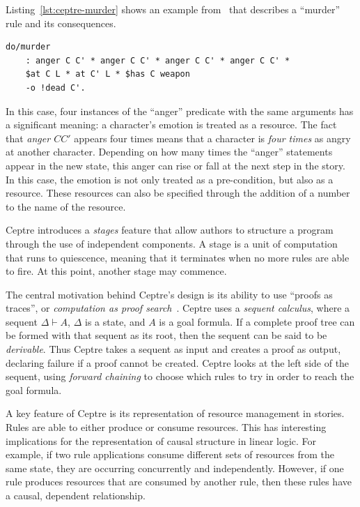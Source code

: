 \documentclass[11pt]{report}
\begin{document}
Listing~\ref{lst:ceptre-murder} shows an example from~\citet{martens2015ceptre}
that describes a ``murder'' rule and its consequences.

\begin{lstlisting}[label=lst:ceptre-murder,showstringspaces=false]
do/murder
    : anger C C' * anger C C' * anger C C' * anger C C' *
    $at C L * at C' L * $has C weapon
    -o !dead C'.
\end{lstlisting}

In this case, four instances of the ``anger'' predicate with the same arguments
has a significant meaning: a character's emotion is treated as a resource. The
fact that \emph{anger $C C'$} appears four times means that a character is
\emph{four times} as angry at another character. Depending on how many times the
``anger'' statements appear in the new state, this anger can rise or fall at the
next step in the story. In this case, the emotion is not only treated as a
pre-condition, but also as a resource. These resources can also be specified
through the addition of a number to the name of the resource.

Ceptre introduces a \emph{stages} feature that allow authors to structure a
program through the use of independent components. A stage is a unit of
computation that runs to quiescence, meaning that it terminates when no more
rules are able to fire. At this point, another stage may commence.

The central motivation behind Ceptre's design is its ability to use ``proofs as
traces'', or \emph{computation as proof search}~\citep{hodas1991logic}. Ceptre
uses a \emph{sequent calculus}, where a sequent $\Delta \vdash A$, $\Delta$ is a
state, and $A$ is a goal formula. If a complete proof tree can be formed with
that sequent as its root, then the sequent can be said to be \emph{derivable}.
Thus Ceptre takes a sequent as input and creates a proof as output, declaring
failure if a proof cannot be created. Ceptre looks at the left side of the
sequent, using \emph{forward chaining} to choose which rules to try in order to
reach the goal formula.

A key feature of Ceptre is its representation of resource management in stories.
Rules are able to either produce or consume resources. This has interesting
implications for the representation of causal structure in linear logic. For
example, if two rule applications consume different sets of resources from the
same state, they are occurring concurrently and independently. However, if one
rule produces resources that are consumed by another rule, then these rules have
a causal, dependent relationship.
\end{document}
